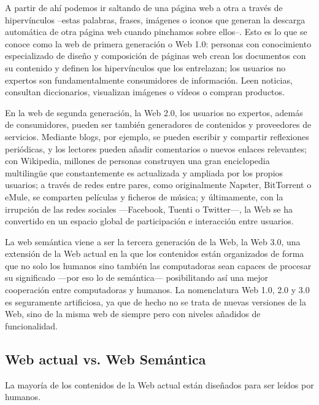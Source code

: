 A partir de ahí podemos ir saltando de una página web a otra a través de hipervínculos –estas palabras, frases, imágenes o iconos que generan la descarga automática de otra página web cuando pinchamos sobre ellos–. Esto es lo que se conoce como la web de primera generación o Web 1.0: personas con conocimiento especializado de diseño y composición de páginas web crean los documentos con su contenido y definen los hipervínculos que los entrelazan; los usuarios no expertos son fundamentalmente consumidores de información. Leen noticias, consultan diccionarios, visualizan imágenes o vídeos o compran productos. %

En la web de segunda generación, la Web 2.0, los usuarios no expertos, además de consumidores, pueden ser también generadores de contenidos y proveedores de servicios. Mediante blogs, por ejemplo, se pueden escribir y compartir reflexiones periódicas, y los lectores pueden añadir comentarios o nuevos enlaces relevantes; con Wikipedia, millones de personas construyen una gran enciclopedia multilingüe que constantemente es actualizada y ampliada por los propios usuarios; a través de redes entre pares, como originalmente Napster, BitTorrent o eMule, se comparten películas y ficheros de música; y últimamente, con la irrupción de las redes sociales —Facebook, Tuenti o Twitter—, la Web se ha convertido en un espacio global de participación e interacción entre usuarios.%

La web semántica viene a ser la tercera generación de la Web, la Web 3.0, una extensión de la Web actual en la que los contenidos están organizados de forma que no solo los humanos sino también las computadoras sean capaces de procesar su significado —por eso lo de semántica— posibilitando así una mejor cooperación entre computadoras y humanos. La nomenclatura Web 1.0, 2.0 y 3.0 es seguramente artificiosa, ya que de hecho no se trata de nuevas versiones de la Web, sino de la misma web de siempre pero con niveles añadidos de funcionalidad. %


 
 
\subsection{Web actual vs. Web Semántica}

La mayoría de los contenidos de la Web actual están diseñados para ser leídos por humanos.

